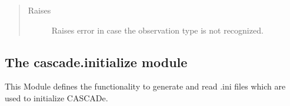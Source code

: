 \documentclass[a4paper,10pt,english]{sphinxmanual}
\begin{document}
\begin{fulllineitems}
\begin{fulllineitems}
\begin{quote}
\begin{description}
\item[{Raises}] \leavevmode
{} \textendash{} Raises error in case the observation type is not recognized.

\end{description}\end{quote}

\end{fulllineitems}


\end{fulllineitems}



\subsection{The cascade.initialize module}
\label{\detokenize{cascade.initialize:module-cascade.initialize.initialize}}\label{\detokenize{cascade.initialize:the-cascade-initialize-module}}\label{\detokenize{cascade.initialize::doc}}
This Module defines the functionality to generate and read .ini files which
are used to initialize CASCADe.
\end{document}
